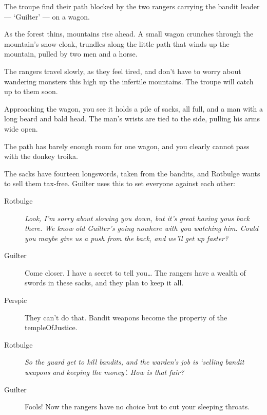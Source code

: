 \documentclass[10pt,twoside]{book}
\begin{document}
The troupe find their path blocked by the two \glspl{ranger} carrying the bandit leader --- `Guilter' --- on a wagon.

\begin{boxtext}[]
  As the forest thins, mountains rise ahead.
  A small wagon
  \ifnum{}%
    crunches through the mountain's snow-cloak,
  \else%
    trundles along the little path that winds up the mountain,
  \fi%
  pulled by two men and a horse.
\end{boxtext}

The \glspl{ranger} travel slowly, as they feel tired, and don't have to worry about wandering \glspl{monster} this high up the infertile mountains.
The troupe will catch up to them soon.


\begin{boxtext}[]
  Approaching the wagon, you see it holds a pile of sacks, all full, and a man with a long beard and bald head.
  The man's wrists are tied to the side, pulling his arms wide open.

  The path has barely enough room for one wagon, and you clearly cannot pass with the donkey troika.
\end{boxtext}

The sacks have fourteen longswords, taken from the bandits, and Rotbulge wants to sell them tax-free.
Guilter uses this to set everyone against each other:

\begin{description}
  \item[Rotbulge]\it
  Look, I'm sorry about slowing you down, but it's great having yous back there.
  We know old Guilter's going nowhere with you watching him.
  Could you maybe give us a push from the back, and we'll get up faster?
  \item[Guilter]\sc
  Come closer.
  {\small
    I have a secret to tell you\ldots
    The \glspl{ranger} have a wealth of swords in these sacks, and they plan to keep it all.
  }
  \item[Perspic]\rm
  They can't do that.
  Bandit weapons become the property of the \gls{templeOfJustice}.
  \item[Rotbulge]\it
  So the \gls{guard} get to kill bandits, and the \gls{warden}'s job is `selling bandit weapons and keeping the money'.
  How is that fair?
  \item[Guilter]\sc
  Fools!
  {\small
    Now the \glspl{ranger} have no choice but to cut your sleeping throats.
  }
\end{description}
\end{document}
